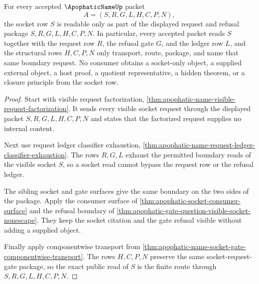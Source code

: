 \begin{theorem}
\label{thm:apophatic-name-socket-request-gate-exactness}
For every accepted $\ApophaticNameUp$ packet
$$
A=(S,R,G,L,H,C,P,N),
$$
the socket row $S$ is readable only as part of the displayed request and refusal package $S,R,G,L,H,C,P,N$. In particular, every accepted packet reads $S$ together with the request row $R$, the refusal gate $G$, and the ledger row $L$, and the structural rows $H,C,P,N$ only transport, route, package, and name that same boundary request. No consumer obtains a socket-only object, a supplied external object, a host proof, a quotient representative, a hidden theorem, or a closure principle from the socket row.
\end{theorem}
\begin{proof}
Start with visible request factorization, \autoref{thm:apophatic-name-visible-request-factorization}. It sends every visible socket request through the displayed packet $S,R,G,L,H,C,P,N$ and states that the factorized request supplies no internal content.

Next use request ledger classifier exhaustion, \autoref{thm:apophatic-name-request-ledger-classifier-exhaustion}. The rows $R,G,L$ exhaust the permitted boundary reads of the visible socket $S$, so a socket read cannot bypass the request row or the refusal ledger.

The sibling socket and gate surfaces give the same boundary on the two sides of the package. Apply the consumer surface of \autoref{thm:apophatic-socket-consumer-surface} and the refusal boundary of \autoref{thm:apophatic-gate-question-visible-socket-nonescape}. They keep the socket citation and the gate refusal visible without adding a supplied object.

Finally apply componentwise transport from \autoref{thm:apophatic-name-socket-gate-componentwise-transport}. The rows $H,C,P,N$ preserve the same socket-request-gate package, so the exact public read of $S$ is the finite route through $S,R,G,L,H,C,P,N$.
\end{proof}

